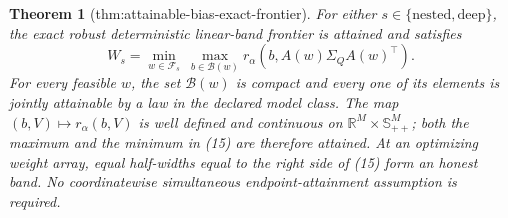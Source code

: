 \documentclass{article}
\newtheorem{theorem}{Theorem}
\begin{document}
\begin{theorem}[thm:attainable-bias-exact-frontier]\label{thm:attainable-bias-exact-frontier}
For either \(s\in\{\mathrm{nested},\mathrm{deep}\}\), the exact robust
deterministic linear-band frontier is attained and satisfies
\[
 W_s=\min_{w\in\mathcal F_s}\ \max_{b\in\mathcal B(w)}
 r_\alpha\!\left(b,A(w)\Sigma_QA(w)^{\top}\right). \tag{15}
\]
For every feasible \(w\), the set \(\mathcal B(w)\) is compact and every one
of its elements is jointly attainable by a law in the declared model class.
The map \((b,V)\mapsto r_\alpha(b,V)\) is well defined and continuous on
\(\mathbb R^M\times\mathbb S_{++}^M\); both the maximum and the minimum in
(15) are therefore attained.  At an optimizing weight array, equal
half-widths equal to the right side of (15) form an honest band.  No
coordinatewise simultaneous endpoint-attainment assumption is required.
\end{theorem}
\end{document}
